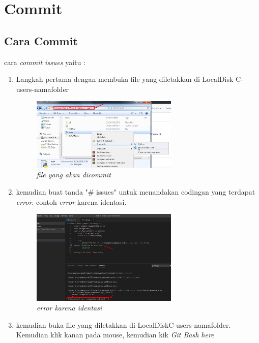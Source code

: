 \chapter{Commit}

\section{Cara Commit}
\par cara \textit{commit issues} yaitu :

\begin{enumerate}
\item Langkah pertama dengan membuka file yang diletakkan di LocalDisk C-users-namafolder 

\begin{figure}[!htbp]
    \centering
    \includegraphics[width=7cm]{figures/file}
    \caption{\textit{file yang akan dicommit}}
\end{figure}

\item kemudian buat tanda "\# issues" untuk menandakan codingan yang terdapat \textit{error}. contoh \textit{error} karena identasi.

\begin{figure}[!htbp]
    \centering
    \includegraphics[width=7cm]{figures/error}
    \caption{\textit{error karena identasi}}
\end{figure}

\newpage

\item kemudian buka file yang diletakkan di LocalDiskC-users-namafolder. Kemudian klik kanan pada mouse, kemudian kik \textit{Git Bash here}


\end{enumerate}
